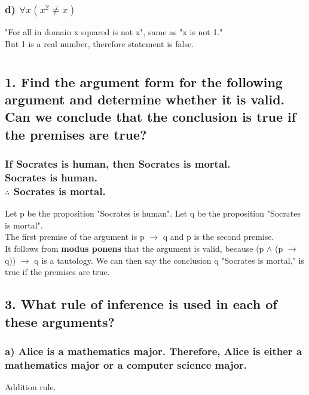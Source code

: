 \documentclass[11pt, oneside]{article} %
\numberwithin{equation}{section} %
\numberwithin{figure}{section} %
\numberwithin{table}{section} %
\begin{document}
\subsubsection{d) $\forall$$x(x^2 \neq x)$} 
"For all in domain x squared is not x", same as "x is not 1."\\
But 1 is a real number, therefore statement is false.

\section{}
\subsection{1. Find the argument form for the following argument and determine whether it is valid. Can we conclude that the conclusion is true if the premises are true?}
\subsubsection{If Socrates is human, then Socrates is mortal. \\
Socrates is human.\\
$\therefore$ Socrates is mortal.}
Let p be the proposition "Socrates is human". Let q be the proposition "Socrates is mortal". \\
The first premise of the argument is p $\rightarrow$ q and p is the second premise. \\
It follows from \textbf{modus ponens} that the argument is valid, because (p $\wedge$ (p $\rightarrow$ q)) $\rightarrow$ q is a tautology. We can then say the conclusion q "Socrates is mortal," is true if the premises are true.


\subsection{3. What rule of inference is used in each of these arguments?}
\subsubsection{a) Alice is a mathematics major. Therefore, Alice is either a mathematics major or a computer science major.}
Addition rule. 
\end{document}
